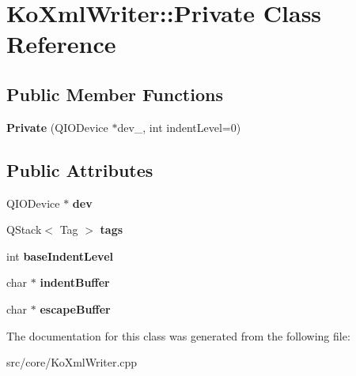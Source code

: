 \hypertarget{classKoXmlWriter_1_1Private}{
\section{KoXmlWriter::Private Class Reference}
\label{classKoXmlWriter_1_1Private}
}
\subsection*{Public Member Functions}
\begin{DoxyCompactItemize}
\item 
\hypertarget{classKoXmlWriter_1_1Private_a91f7d48d7013b41cc6e07d17e731dcaa}{
{\bfseries Private} (QIODevice $\ast$dev\_\-, int indentLevel=0)}
\label{classKoXmlWriter_1_1Private_a91f7d48d7013b41cc6e07d17e731dcaa}

\end{DoxyCompactItemize}
\subsection*{Public Attributes}
\begin{DoxyCompactItemize}
\item 
\hypertarget{classKoXmlWriter_1_1Private_a57be72c40414dddb1517c8461da380ef}{
QIODevice $\ast$ {\bfseries dev}}
\label{classKoXmlWriter_1_1Private_a57be72c40414dddb1517c8461da380ef}

\item 
\hypertarget{classKoXmlWriter_1_1Private_ae9808348b31857d4396ae2d32101cb8f}{
QStack$<$ Tag $>$ {\bfseries tags}}
\label{classKoXmlWriter_1_1Private_ae9808348b31857d4396ae2d32101cb8f}

\item 
\hypertarget{classKoXmlWriter_1_1Private_ab66933869104316c8b4e8e1e27504652}{
int {\bfseries baseIndentLevel}}
\label{classKoXmlWriter_1_1Private_ab66933869104316c8b4e8e1e27504652}

\item 
\hypertarget{classKoXmlWriter_1_1Private_ab81452b11578e1c5c52d1e9898d32d63}{
char $\ast$ {\bfseries indentBuffer}}
\label{classKoXmlWriter_1_1Private_ab81452b11578e1c5c52d1e9898d32d63}

\item 
\hypertarget{classKoXmlWriter_1_1Private_ad97c1a28ca473561cff4278db14519ef}{
char $\ast$ {\bfseries escapeBuffer}}
\label{classKoXmlWriter_1_1Private_ad97c1a28ca473561cff4278db14519ef}

\end{DoxyCompactItemize}


The documentation for this class was generated from the following file:\begin{DoxyCompactItemize}
\item 
src/core/KoXmlWriter.cpp\end{DoxyCompactItemize}
